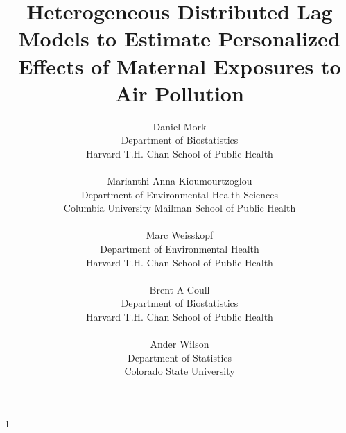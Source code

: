 \documentclass[12pt]{article}
\newcommand{\blind}{1}
\begin{document}
%

\def\spacingset#1{\renewcommand{\baselinestretch}%
{#1}\small\normalsize} \spacingset{1}



\blind
{
  \title{\bf Heterogeneous Distributed Lag Models to Estimate Personalized Effects of Maternal Exposures to Air Pollution}
  \author{Daniel Mork\\%
Department of Biostatistics\\ Harvard T.H. Chan School of Public Health\\\\

Marianthi-Anna Kioumourtzoglou\\
Department of Environmental Health Sciences\\
Columbia University Mailman School of Public Health\\\\

Marc Weisskopf\\
Department of Environmental Health\\ 
Harvard T.H. Chan School of Public Health\\\\ 

Brent A Coull\\
Department of Biostatistics\\
Harvard T.H. Chan School of Public Health\\\\ 

Ander Wilson\\ 
Department of Statistics\\ Colorado State University}
  \maketitle
} \fi
\end{document}
